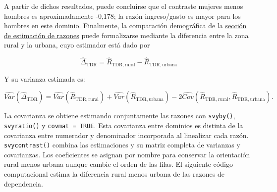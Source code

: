 \documentclass[
  spanish,
  11pt,
  letterpaper,
  oneside,
  open=any]{scrbook}
\begin{document}
A partir de dichos resultados, puede concluirse que el contraste mujeres
menos hombres es aproximadamente -0,178; la razón ingreso/gasto es mayor
para los hombres en este dominio. Finalmente, la comparación demográfica
de la \hyperref[estimacion-de-razones]{sección de estimación de razones}
puede formalizarse mediante la diferencia entre la zona rural y la
urbana, cuyo estimador está dado por

\[
\hat\Delta_{\mathrm{TDR}}=\hat R_{\mathrm{TDR},\mathrm{rural}}-\hat R_{\mathrm{TDR},\mathrm{urbana}}
\]

Y su varianza estimada es:

\[
\widehat{Var}(\hat\Delta_{\mathrm{TDR}}) =
\widehat{Var}(\hat R_{\mathrm{TDR},\mathrm{rural}})+
\widehat{Var}(\hat R_{\mathrm{TDR},\mathrm{urbana}})-
2\widehat{Cov}(\hat R_{\mathrm{TDR},\mathrm{rural}},\hat R_{\mathrm{TDR},\mathrm{urbana}}).
\]

La covarianza se obtiene estimando conjuntamente las razones con
\texttt{svyby()}, \texttt{svyratio()} y \texttt{covmat\ =\ TRUE}. Esta
covarianza entre dominios es distinta de la covarianza entre numerador y
denominador incorporada al linealizar cada razón. \texttt{svycontrast()}
combina las estimaciones y su matriz completa de varianzas y
covarianzas. Los coeficientes se asignan por nombre para conservar la
orientación rural menos urbana aunque cambie el orden de las filas. El
siguiente código computacional estima la diferencia rural menos urbana
de las razones de dependencia.
\end{document}
